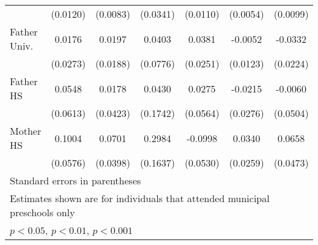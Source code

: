 \begin{table}[htbp]
\begin{tabular}{l*{6}{c}}
            &    (0.0120)         &    (0.0083)         &    (0.0341)         &    (0.0110)         &    (0.0054)         &    (0.0099)         \\
\addlinespace
Father Univ.&      0.0176         &      0.0197         &      0.0403         &      0.0381         &     -0.0052         &     -0.0332         \\
            &    (0.0273)         &    (0.0188)         &    (0.0776)         &    (0.0251)         &    (0.0123)         &    (0.0224)         \\
\addlinespace
Father HS   &      0.0548         &      0.0178         &      0.0430         &      0.0275         &     -0.0215         &     -0.0060         \\
            &    (0.0613)         &    (0.0423)         &    (0.1742)         &    (0.0564)         &    (0.0276)         &    (0.0504)         \\
\addlinespace
Mother HS   &      0.1004         &      0.0701         &      0.2984         &     -0.0998         &      0.0340         &      0.0658         \\
            &    (0.0576)         &    (0.0398)         &    (0.1637)         &    (0.0530)         &    (0.0259)         &    (0.0473)         \\
\bottomrule
\multicolumn{7}{l}{\footnotesize Standard errors in parentheses}\\
\multicolumn{7}{l}{\footnotesize Estimates shown are for individuals that attended municipal preschools only}\\
\multicolumn{7}{l}{\footnotesize \sym{*} \(p<0.05\), \sym{**} \(p<0.01\), \sym{***} \(p<0.001\)}\\
\end{tabular}
\end{table}

